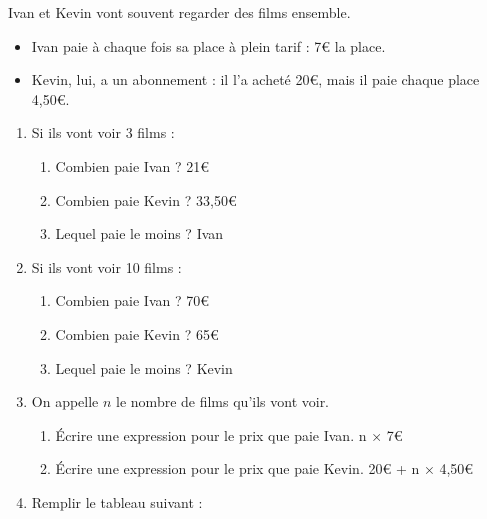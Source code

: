\documentclass[a4paper,12pt]{article}
\newcommand{\correction}[1]{{\color{red}#1}}
\begin{document}
\maketitle

\begin{enonce}
	Ivan et Kevin vont souvent regarder des films ensemble.

	\begin{itemize}
		\item Ivan paie à chaque fois sa place à plein tarif : 7€ la place.
		\item Kevin, lui, a un abonnement : il l'a acheté 20€, mais il paie chaque place 4,50€.
	\end{itemize}
\end{enonce}

\begin{enumerate}
	\item Si ils vont voir 3 films :
	      \begin{enumerate}
		      \item Combien paie Ivan ? \correction{21€}
		      \item Combien paie Kevin ? \correction{33,50€}
		      \item Lequel paie le moins ? \correction{Ivan}
	      \end{enumerate}
	\item Si ils vont voir 10 films :
	      \begin{enumerate}
		      \item Combien paie Ivan ? \correction{70€}
		      \item Combien paie Kevin ? \correction{65€}
		      \item Lequel paie le moins ? \correction{Kevin}
	      \end{enumerate}
	\item On appelle $n$ le nombre de films qu'ils vont voir.
	      \begin{enumerate}
		      \item Écrire une expression pour le prix que paie Ivan. \correction{n × 7€}
		      \item Écrire une expression pour le prix que paie Kevin. \correction{20€ + n × 4,50€}
	      \end{enumerate}
	\item Remplir le tableau suivant :


\end{enumerate}
\end{document}
